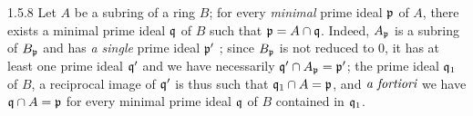 \documentclass[../main.tex]{subfiles}
\begin{document}
\begin{env}{1.5.8}
Let $A$ be a subring of a ring $B$; for every \emph{minimal} prime ideal $\mathfrak{p}$ of $A$, there
exists a minimal prime ideal $\mathfrak{q}$ of $B$ such that $\mathfrak{p}=A\cap\mathfrak{q}$. Indeed, $A_\mathfrak{p}$
is a subring of $B_\mathfrak{p}$  and has \emph{a single} prime ideal $\mathfrak{p}'$ ; since
$B_\mathfrak{p}$ is not reduced to $0$, it has at least one prime ideal $\mathfrak{q}'$ and we have
necessarily $\mathfrak{q}'\cap A_\mathfrak{p}=\mathfrak{p}'$; the prime ideal $\mathfrak{q}_1$ of $B$, a reciprocal image
of $\mathfrak{q}'$ is thus such that $\mathfrak{q}_1\cap A=\mathfrak{p}$, and $\emph{a fortiori}$ we have
$\mathfrak{q}\cap A=\mathfrak{p}$ for every minimal prime ideal $\mathfrak{q}$ of $B$ contained in $\mathfrak{q}_1$.
\end{env}
\end{document}
